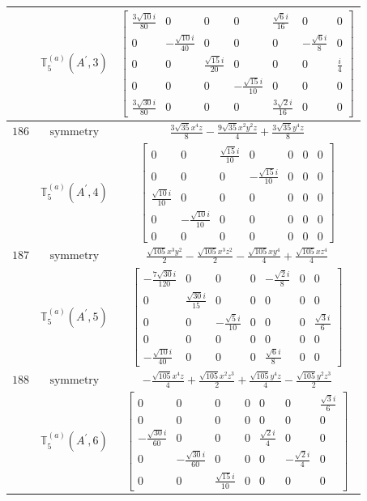 \documentclass[fleqn,8pt,landscape]{jsarticle}
\begin{document}
\begin{longtable}{ccc}
$  $ & $ \mathbb{T}_{5}^{(a)}(A^{\prime},3) $ & $ \begin{bmatrix} \frac{3 \sqrt{10} i}{80} & 0 & 0 & 0 & \frac{\sqrt{6} i}{16} & 0 & 0 \\ 0 & - \frac{\sqrt{10} i}{40} & 0 & 0 & 0 & - \frac{\sqrt{6} i}{8} & 0 \\ 0 & 0 & \frac{\sqrt{15} i}{20} & 0 & 0 & 0 & \frac{i}{4} \\ 0 & 0 & 0 & - \frac{\sqrt{15} i}{10} & 0 & 0 & 0 \\ \frac{3 \sqrt{30} i}{80} & 0 & 0 & 0 & \frac{3 \sqrt{2} i}{16} & 0 & 0 \end{bmatrix} $ \\ \hline
$ 186 $ & $ \text{symmetry} $ & $ \frac{3 \sqrt{35} x^{4} z}{8} - \frac{9 \sqrt{35} x^{2} y^{2} z}{4} + \frac{3 \sqrt{35} y^{4} z}{8} $ \\
$  $ & $ \mathbb{T}_{5}^{(a)}(A^{\prime},4) $ & $ \begin{bmatrix} 0 & 0 & \frac{\sqrt{15} i}{10} & 0 & 0 & 0 & 0 \\ 0 & 0 & 0 & - \frac{\sqrt{15} i}{10} & 0 & 0 & 0 \\ \frac{\sqrt{10} i}{10} & 0 & 0 & 0 & 0 & 0 & 0 \\ 0 & - \frac{\sqrt{10} i}{10} & 0 & 0 & 0 & 0 & 0 \\ 0 & 0 & 0 & 0 & 0 & 0 & 0 \end{bmatrix} $ \\ \hline
$ 187 $ & $ \text{symmetry} $ & $ \frac{\sqrt{105} x^{3} y^{2}}{2} - \frac{\sqrt{105} x^{3} z^{2}}{2} - \frac{\sqrt{105} x y^{4}}{4} + \frac{\sqrt{105} x z^{4}}{4} $ \\
$  $ & $ \mathbb{T}_{5}^{(a)}(A^{\prime},5) $ & $ \begin{bmatrix} - \frac{7 \sqrt{30} i}{120} & 0 & 0 & 0 & - \frac{\sqrt{2} i}{8} & 0 & 0 \\ 0 & \frac{\sqrt{30} i}{15} & 0 & 0 & 0 & 0 & 0 \\ 0 & 0 & - \frac{\sqrt{5} i}{10} & 0 & 0 & 0 & \frac{\sqrt{3} i}{6} \\ 0 & 0 & 0 & 0 & 0 & 0 & 0 \\ - \frac{\sqrt{10} i}{40} & 0 & 0 & 0 & \frac{\sqrt{6} i}{8} & 0 & 0 \end{bmatrix} $ \\ \hline
$ 188 $ & $ \text{symmetry} $ & $ - \frac{\sqrt{105} x^{4} z}{4} + \frac{\sqrt{105} x^{2} z^{3}}{2} + \frac{\sqrt{105} y^{4} z}{4} - \frac{\sqrt{105} y^{2} z^{3}}{2} $ \\
$  $ & $ \mathbb{T}_{5}^{(a)}(A^{\prime},6) $ & $ \begin{bmatrix} 0 & 0 & 0 & 0 & 0 & 0 & \frac{\sqrt{3} i}{6} \\ 0 & 0 & 0 & 0 & 0 & 0 & 0 \\ - \frac{\sqrt{30} i}{60} & 0 & 0 & 0 & \frac{\sqrt{2} i}{4} & 0 & 0 \\ 0 & - \frac{\sqrt{30} i}{60} & 0 & 0 & 0 & - \frac{\sqrt{2} i}{4} & 0 \\ 0 & 0 & \frac{\sqrt{15} i}{10} & 0 & 0 & 0 & 0 \end{bmatrix} $ \\ \hline

\end{longtable}
\end{document}
